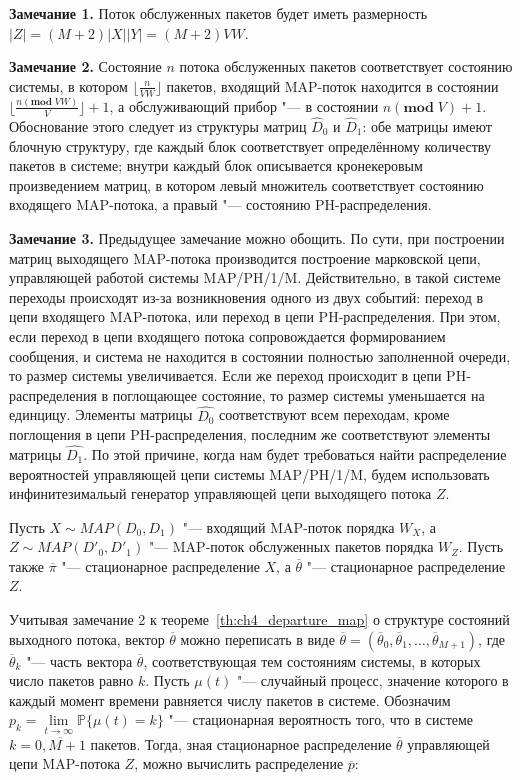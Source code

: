 \textbf{Замечание 1.} Поток обслуженных пакетов будет иметь размерность $|Z| = (M+2) |X| |Y| = (M+2)VW$.

\textbf{Замечание 2.} Состояние $n$ потока обслуженных пакетов соответствует состоянию системы, в котором $\lfloor \frac{n}{VW} \rfloor$ пакетов, входящий MAP-поток находится в состоянии $\lfloor \frac{n (\mathbf{mod}\;VW)}{V} \rfloor + 1$, а обслуживающий прибор "--- в состоянии $n (\mathbf{mod}\;V) + 1$. Обоснование этого следует из структуры матриц $\hat{D}_0$ и $\hat{D}_1$: обе матрицы имеют блочную структуру, где каждый блок соответствует определённому количеству пакетов в системе; внутри каждый блок описывается кронекеровым произведением матриц, в котором левый множитель соответствует состоянию входящего MAP-потока, а правый "--- состоянию PH-распределения.

\textbf{Замечание 3.} Предыдущее замечание можно обощить. По сути, при построении матриц выходящего MAP-потока производится построение марковской цепи, управляющей работой системы MAP/PH/1/M. Действительно, в такой системе переходы происходят из-за возникновения одного из двух событий: переход в цепи входящего MAP-потока, или переход в цепи PH-распределения. При этом, если переход в цепи входящего потока сопровождается формированием сообщения, и система не находится в состоянии полностью заполненной очереди, то размер системы увеличивается. Если же переход происходит в цепи PH-распределения в поглощающее состояние, то размер системы уменьшается на единцицу. Элементы матрицы $\hat{D_0}$ соответствуют всем переходам, кроме поглощения в цепи PH-распределения, последним же соответствуют элементы матрицы $\hat{D_1}$. По этой причине, когда нам будет требоваться найти распределение вероятностей управляющей цепи системы MAP/PH/1/M, будем использовать инфинитезимальый генератор управляющей цепи выходящего потока $Z$.

Пусть $X \sim MAP(D_0, D_1)$ "--- входящий MAP-поток порядка $W_X$, а $Z \sim MAP(D'_0, D'_1)$ "--- MAP-поток обслуженных пакетов порядка $W_Z$. Пусть также $\overline{\pi}$ "--- стационарное распределение $X$, а $\overline{\theta}$ "--- стационарное распределение $Z$. 

Учитывая замечание 2 к теореме~\ref{th:ch4_departure_map} о структуре состояний выходного потока, вектор $\overline{\theta}$ можно переписать в виде $\overline{\theta} = (\overline{\theta}_0, \overline{\theta}_1, \dots, \overline{\theta}_{M+1})$, где $\overline{\theta}_k$ "--- часть вектора $\overline{\theta}$, соответствующая тем состояниям системы, в которых число пакетов равно $k$. Пусть $\mu(t)$ "--- случайный процесс, значение которого в каждый момент времени равняется числу пакетов в системе. Обозначим $p_k = \lim\limits_{t \rightarrow \infty} \mathbb{P}\{\mu(t) = k\}$ "--- стационарная вероятность того, что в системе $k=\overline{0,M+1}$ пакетов. Тогда, зная стационарное распределение $\overline{\theta}$ управляющей цепи MAP-потока $Z$, можно вычислить распределение $\overline{p}$:

